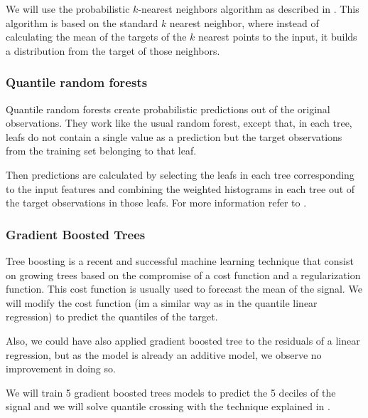 \documentclass[a4paper,twocolumn,5p]{elsarticle}
\begin{document}
We will use the probabilistic $k$-nearest neighbors algorithm as
described in \cite{quantileknnmangalova}.  This algorithm is based on
the standard $k$ nearest neighbor, where instead of calculating the
mean of the targets of the $k$ nearest points to the input, it builds
a distribution from the target of those neighbors.

\subsubsection{Quantile random forests}


Quantile random forests create probabilistic predictions out of the
original observations. They work like the usual random forest, except
that, in each tree, leafs do not contain a single value as a
prediction but the target observations from the training set belonging
to that
leaf.%

Then predictions are calculated by selecting the leafs in each tree
corresponding to the input features and combining the weighted
histograms in each tree out of the target observations in those leafs.
For more information refer to \cite{quantregforests}.

\subsubsection{Gradient Boosted Trees}

Tree boosting \cite{friedman_greedy_2001} is a recent and successful
machine learning technique that consist on growing trees based on the
compromise of a cost function and a regularization function. This cost
function is usually used to forecast the mean of the signal. We will
modify the cost function (im a similar way as in the quantile linear
regression) to predict the quantiles of the target.

Also, we could have also applied gradient boosted tree to the
residuals of a linear regression, but as the model is already an
additive model, we observe no improvement in doing so.

We will train 5 gradient boosted trees models to predict the 5 deciles
of the signal and we will solve quantile crossing with the technique
explained in \cite{cross}.
\end{document}
